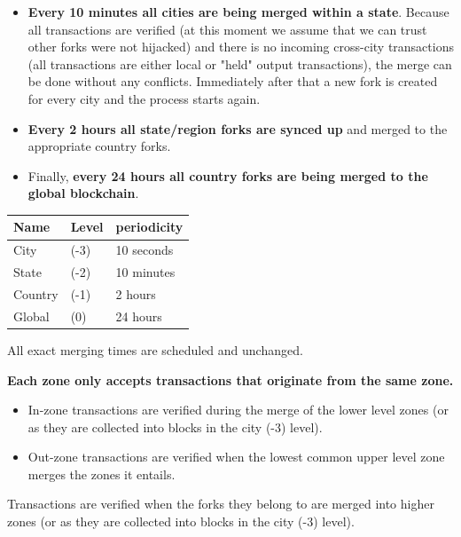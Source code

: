 \documentclass[portrait,ansidpaper,fontscale=0.445]{baposter} %
\begin{document}
\begin{poster}
{\begin{multicols}{2}
\begin{itemize}[leftmargin=1em]
    \item \textbf{Every 10 minutes all cities are being merged within a state}. Because
        all transactions are verified (at this moment we assume that we can
        trust other forks were not hijacked) and there is no incoming cross-city
        transactions (all transactions are either local or "held" output
        transactions), the merge can be done without any conflicts. Immediately
        after that a new fork is created for every city and the process starts
        again.

    \item \textbf{Every 2 hours all state/region forks are synced up} and merged
        to the appropriate country forks.

    \item Finally, \textbf{every 24 hours all country forks are being merged to the
    global blockchain}.

\end{itemize}

\vspace{-1.5em}
\begin{center}
\begin{tabular}{l l l}
\textbf{Name} & \textbf{Level} & \textbf{periodicity}  \\
\midrule
City  &   (-3) & 10 seconds \\
State &   (-2) & 10 minutes \\
Country & (-1) & 2 hours \\
Global  & (0)  & 24 hours \\
\end{tabular}
\end{center}

All exact merging times are scheduled and unchanged.

\textbf{Each zone only accepts transactions that originate from the same zone.}
\begin{itemize}[leftmargin=1em]
    \item In-zone transactions are verified during the merge of the
        lower level zones (or as they are collected into blocks in the
        city (-3) level).
    \item Out-zone transactions are verified when the lowest common
        upper level zone merges the zones it entails.
\end{itemize}

Transactions are verified when the forks they belong to are merged into higher
zones (or as they are collected into blocks in the city (-3) level).



\end{multicols}}
\end{poster}
\end{document}
